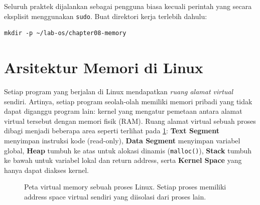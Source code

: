 \begin{notebox}
Seluruh praktek dijalankan sebagai pengguna biasa kecuali perintah yang secara
eksplisit menggunakan \texttt{sudo}. Buat direktori kerja terlebih dahulu:
\begin{lstlisting}
mkdir -p ~/lab-os/chapter08-memory
\end{lstlisting}
\end{notebox}

\section{Arsitektur Memori di Linux}

Setiap program yang berjalan di Linux mendapatkan \textit{ruang alamat virtual}
sendiri. Artinya, setiap program seolah-olah memiliki memori pribadi yang tidak dapat
diganggu program lain: kernel yang mengatur pemetaan antara alamat virtual tersebut
dengan memori fisik (RAM). Ruang alamat virtual sebuah proses dibagi menjadi beberapa
area seperti terlihat pada \cref{fig:memory-layout}: \textbf{Text Segment} menyimpan
instruksi kode (read-only), \textbf{Data Segment} menyimpan variabel global, \textbf{Heap}
tumbuh ke atas untuk alokasi dinamis (\texttt{malloc()}), \textbf{Stack} tumbuh ke
bawah untuk variabel lokal dan return address, serta \textbf{Kernel Space} yang hanya
dapat diakses kernel.

\begin{figure}[H]
\centering
{}
\caption{Peta virtual memory sebuah proses Linux. Setiap proses memiliki address space
virtual sendiri yang diisolasi dari proses lain.}
\label{fig:memory-layout}
\end{figure}

